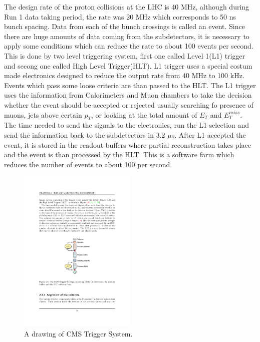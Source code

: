 The design rate of the proton collisions at the LHC is 40 MHz, although during Run 1 data taking period, the rate was 20 MHz which corresponds to 50 ns bunch spacing. Data from each of the bunch crossings is called an event. Since there are huge amounts of data coming from the subdetectors, it is necessary to apply some conditions which can reduce the rate to about 100 events per second. This is done by two level triggering system, first one called Level 1(L1) trigger and secong one called High Level Trigger(HLT). L1 trigger uses a special costum made electronics designed to reduce the output rate from 40 MHz to 100 kHz. Events which pass some loose criteria are than passed to the HLT. The L1 trigger uses the information from Calorimeters and Muon chambers to take the decision whether the event should be accepted or rejected usually searching fo presence of muons, jets above certain $p_T$, or looking at the total amount of $E_T$ and $E_T^{miss}$. The time needed to send the signals to the electronics, run the L1 selection and send the information back to the subdetectors in 3.2 $\mu$s. After L1 accepted the event, it is stored in the readout buffers where partial reconstruction takes place and the event is than processed by the HLT. This is a software farm which reduces the number of events to about 100 per second. 
\begin{figure}[htbp]
	\centering
		\includegraphics[width=0.5\textwidth]{Figures/trigger.pdf}
	\caption[A drawing of CMS Trigger System.]{A drawing of CMS Trigger System. \cite{Chatrchyan:2008aa}}
	\label{fig:trig}
\end{figure}

